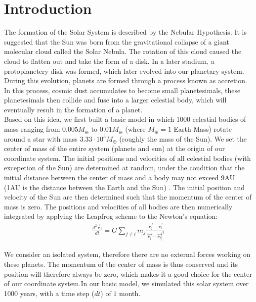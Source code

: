 \section{Introduction}
The formation of the Solar System is described by the Nebular Hypothesis. It is suggested that the Sun was born from the gravitational collapse of a giant molecular cloud called the Solar Nebula. 
The rotation of this cloud caused the cloud to flatten out and take the form of a disk. In a later stadium, a protoplanetery disk was formed, which later evolved into our planetary system.
During this evolution, planets are formed through a process known as accretion.
In this process, cosmic dust accumulates to become small planetesimals, these planetesimals then collide and fuse into a larger celestial body, which will eventually result in the formation of a planet.\\

Based on this idea, we first built a basic model in which 1000 celestial bodies of mass ranging from 0.005$M_{\oplus}$ to 0.01$M_{\oplus}$ (where $M_{\oplus}=1$ Earth Mass)  rotate around a star with mass $3.33\cdot 10^5 M_{\oplus}$ (roughly the mass of the Sun).
We set the center of mass of the entire system (planets and sun) at the origin of our coordinate system. The initial positions and velocities of all celestial bodies (with excepetion of the Sun) are determined at random, under the condition that the initial distance between the center of mass and a body may not exceed 9AU (1AU is the distance between the Earth and the Sun) . The initial position and velocity of the Sun are then determined such that the momentum of the center of mass is zero. The positions and velocities of all bodies are then numerically integrated by applying the Leapfrog scheme to the Newton's equation:
\begin{align}
\frac{d^2\vec{r}_i}{dt}=G\sum_{j\neq i}m_j\frac{\vec{r_j}-\vec{r_i}}{|\vec{r_j}-\vec{r_i}|^3}
\end{align}



We consider an isolated system, therefore there are no external forces working on these planets. The momentum of the center of mass is thus conserved and its position will therefore always be zero, which makes it a good choice for the center of our coordinate system.In our basic model, we simulated this solar system over 1000 years, with a time step (\(dt\)) of $1$ month.\\

